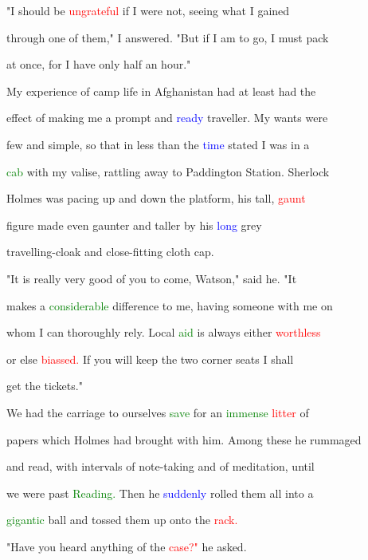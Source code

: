  "I should be \textcolor{red}{ungrateful} if I were not, seeing what I \textcolor{BurntOrange}{gained}

 through one of them," I answered. "But if I am to go, I must pack

 at once, for I have only half an hour."



 My experience of camp life in Afghanistan had at least had the

 effect of making me a prompt and \textcolor{blue}{ready} traveller. My wants were

 few and simple, so that in less than the \textcolor{blue}{time} stated I was in a

 \textcolor{green}{cab} with my valise, rattling away to Paddington Station. Sherlock

 Holmes was pacing up and down the platform, his tall, \textcolor{red}{gaunt}

 figure made even gaunter and taller by his \textcolor{blue}{long} grey

 travelling-cloak and close-fitting cloth \textcolor{BurntOrange}{cap.}



 "It is really very \textcolor{BurntOrange}{good} of you to come, Watson," said he. "It

 makes a \textcolor{green}{considerable} difference to me, having someone with me on

 whom I can thoroughly rely. Local \textcolor{green}{aid} is always either \textcolor{red}{worthless}

 or else \textcolor{red}{biassed.} If you will keep the two corner seats I shall

 get the tickets."



 We had the carriage to ourselves \textcolor{green}{save} for an \textcolor{green}{immense} \textcolor{red}{litter} of

 papers which Holmes had brought with him. Among these he rummaged

 and read, with intervals of note-taking and of meditation, until

 we were past \textcolor{green}{Reading.} Then he \textcolor{blue}{suddenly} rolled them all into a

 \textcolor{green}{gigantic} ball and tossed them up onto the \textcolor{red}{rack.}



 "Have you heard anything of the \textcolor{red}{case?"} he asked.



